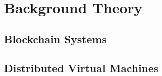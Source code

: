 \chapter{Background Theory}
\label{ch:background}
\section{Blockchain Systems}
\label{sec:blockchain}
\section{Distributed Virtual Machines}
\label{sec:vms}
